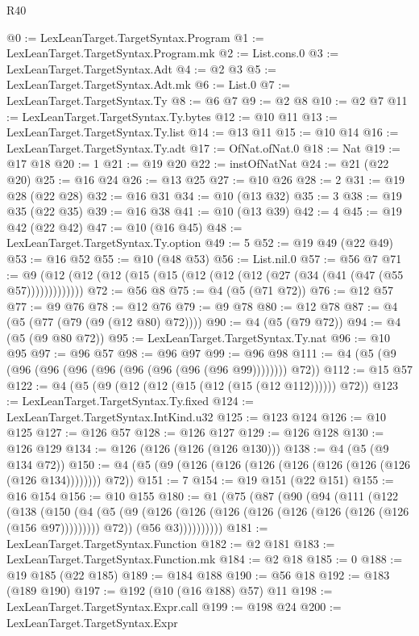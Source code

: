 \begin{lexlean}{R40}
\begin{coremodule}
@0 := LexLeanTarget.TargetSyntax.Program
@1 := LexLeanTarget.TargetSyntax.Program.mk
@2 := List.cons.{0}
@3 := LexLeanTarget.TargetSyntax.Adt
@4 := @2 @3
@5 := LexLeanTarget.TargetSyntax.Adt.mk
@6 := List.{0}
@7 := LexLeanTarget.TargetSyntax.Ty
@8 := @6 @7
@9 := @2 @8
@10 := @2 @7
@11 := LexLeanTarget.TargetSyntax.Ty.bytes
@12 := @10 @11
@13 := LexLeanTarget.TargetSyntax.Ty.list
@14 := @13 @11
@15 := @10 @14
@16 := LexLeanTarget.TargetSyntax.Ty.adt
@17 := OfNat.ofNat.{0}
@18 := Nat
@19 := @17 @18
@20 := 1
@21 := @19 @20
@22 := instOfNatNat
@24 := @21 (@22 @20)
@25 := @16 @24
@26 := @13 @25
@27 := @10 @26
@28 := 2
@31 := @19 @28 (@22 @28)
@32 := @16 @31
@34 := @10 (@13 @32)
@35 := 3
@38 := @19 @35 (@22 @35)
@39 := @16 @38
@41 := @10 (@13 @39)
@42 := 4
@45 := @19 @42 (@22 @42)
@47 := @10 (@16 @45)
@48 := LexLeanTarget.TargetSyntax.Ty.option
@49 := 5
@52 := @19 @49 (@22 @49)
@53 := @16 @52
@55 := @10 (@48 @53)
@56 := List.nil.{0}
@57 := @56 @7
@71 := @9 (@12 (@12 (@12 (@15 (@15 (@12 (@12 (@12 (@27 (@34 (@41 (@47 (@55 @57)))))))))))))
@72 := @56 @8
@75 := @4 (@5 (@71 @72))
@76 := @12 @57
@77 := @9 @76
@78 := @12 @76
@79 := @9 @78
@80 := @12 @78
@87 := @4 (@5 (@77 (@79 (@9 (@12 @80) @72))))
@90 := @4 (@5 (@79 @72))
@94 := @4 (@5 (@9 @80 @72))
@95 := LexLeanTarget.TargetSyntax.Ty.nat
@96 := @10 @95
@97 := @96 @57
@98 := @96 @97
@99 := @96 @98
@111 := @4 (@5 (@9 (@96 (@96 (@96 (@96 (@96 (@96 (@96 (@96 @99)))))))) @72))
@112 := @15 @57
@122 := @4 (@5 (@9 (@12 (@12 (@15 (@12 (@15 (@12 @112)))))) @72))
@123 := LexLeanTarget.TargetSyntax.Ty.fixed
@124 := LexLeanTarget.TargetSyntax.IntKind.u32
@125 := @123 @124
@126 := @10 @125
@127 := @126 @57
@128 := @126 @127
@129 := @126 @128
@130 := @126 @129
@134 := @126 (@126 (@126 (@126 @130)))
@138 := @4 (@5 (@9 @134 @72))
@150 := @4 (@5 (@9 (@126 (@126 (@126 (@126 (@126 (@126 (@126 (@126 @134)))))))) @72))
@151 := 7
@154 := @19 @151 (@22 @151)
@155 := @16 @154
@156 := @10 @155
@180 := @1
    (@75
      (@87
        (@90
          (@94
            (@111
              (@122
                (@138
                  (@150
                    (@4
                      (@5
                        (@9 (@126 (@126 (@126 (@126 (@126 (@126 (@126 (@126 (@156 @97))))))))) @72))
                      (@56 @3))))))))))
@181 := LexLeanTarget.TargetSyntax.Function
@182 := @2 @181
@183 := LexLeanTarget.TargetSyntax.Function.mk
@184 := @2 @18
@185 := 0
@188 := @19 @185 (@22 @185)
@189 := @184 @188
@190 := @56 @18
@192 := @183 (@189 @190)
@197 := @192 (@10 (@16 @188) @57) @11
@198 := LexLeanTarget.TargetSyntax.Expr.call
@199 := @198 @24
@200 := LexLeanTarget.TargetSyntax.Expr

\end{coremodule}
\end{lexlean}
